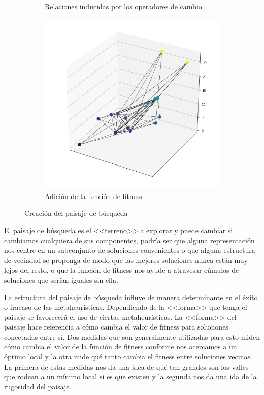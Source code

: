 \begin{figure}[H]
\begin{subfigure}{.5\textwidth}
    \caption{Relaciones inducidas por los operadores de cambio}
\end{subfigure}
\begin{subfigure}{\textwidth}
    \centering
    \includegraphics[scale=.5]{Imagenes/search3.png}
    \caption{Adición de la función de fitness}    
\end{subfigure}
\label{fig:landscape}
\caption{Creación del paisaje de búsqueda}
\end{figure}

El paisaje de búsqueda es el <<terreno>> a explorar y puede cambiar si cambiamos cualquiera de sus componentes, podría ser que alguna representación nos centre en un subconjunto de soluciones convenientes o que alguna estructura de vecindad se proponga de modo que las mejores soluciones nunca están muy lejos del resto, o que la función de fitness nos ayude a atravesar cúmulos de soluciones que serían iguales sin ella.

La estructura del paisaje de búsqueda influye de manera determinante en el éxito o fracaso de las metaheurísticas. Dependiendo de la <<forma>> que tenga el paisaje se favorecerá el uso de ciertas metaheurísticas. La <<forma>> del paisaje hace referencia a cómo cambia el valor de fitness para soluciones conectadas entre sí. Dos medidas que son generalmente utilizadas para esto miden cómo cambia el valor de la función de fitness conforme nos acercamos a un óptimo local y la otra mide qué tanto cambia el fitness entre soluciones vecinas\cite{skauffman}. La primera de estas medidas nos da una idea de qué tan grandes son los valles que rodean a un mínimo local si es que existen y la segunda nos da una ida de la rugosidad del paisaje.

